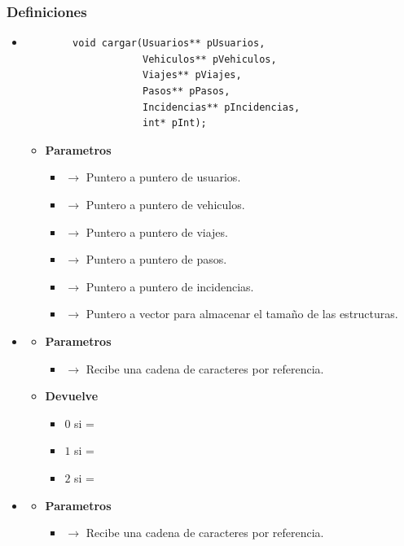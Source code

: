 \subsubsection{Definiciones}
\begin{itemize}
	\item \label{def:cargar}
	\begin{lstlisting}
		void cargar(Usuarios** pUsuarios,
					Vehiculos** pVehiculos,
					Viajes** pViajes,
					Pasos** pPasos,
					Incidencias** pIncidencias,
					int* pInt);
	\end{lstlisting}
	\begin{itemize}
		\item \textbf{Parametros}
		\begin{itemize}
			\item {} $\rightarrow$ Puntero a puntero de usuarios.
			\item {} $\rightarrow$ Puntero a puntero de vehiculos.
			\item {}$\rightarrow$ Puntero a puntero de viajes.
			\item {}$\rightarrow$ Puntero a puntero de pasos.
			\item {}$\rightarrow$ Puntero a puntero de incidencias.
			\item {}$\rightarrow$ Puntero a vector para almacenar el tamaño de las estructuras.
		\end{itemize}
	\newpage
	\end{itemize}
	\item \label{def:estincidencia}
	\begin{itemize}
		\item \textbf{Parametros}
		\begin{itemize}
			\item {} $\rightarrow$ Recibe una cadena de caracteres por referencia.
			
		\end{itemize}
		\item \textbf{Devuelve}
		\begin{itemize}
			\item $0$ si  = 
			\item $1$ si  = 
			\item $2$ si  = 
		\end{itemize}
	\end{itemize}
	\item\label{def:estusuario}
	\begin{itemize}
		\item \textbf{Parametros}
		\begin{itemize}
			\item {} $\rightarrow$ Recibe una cadena de caracteres por referencia.
			

\end{itemize}
\end{itemize}
\end{itemize}
